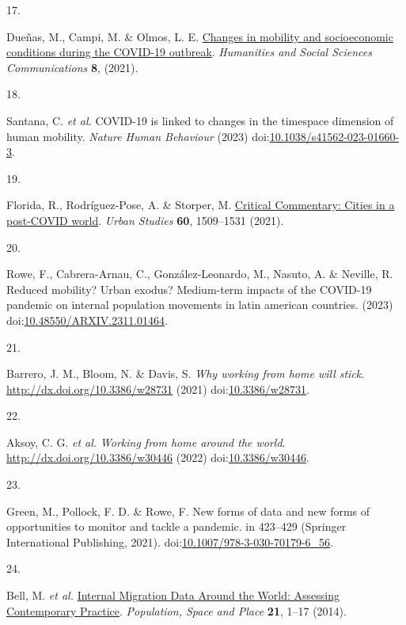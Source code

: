 \documentclass[
  11pt,
]{article}
\newlength{\cslhangindent}
\newlength{\csllabelwidth}
\newenvironment{CSLReferences}[2] %
 {\begin{list}{}{%
  \setlength{\itemindent}{0pt}
  \setlength{\leftmargin}{0pt}
  \setlength{\parsep}{0pt}
  \ifodd #1
   \setlength{\leftmargin}{\cslhangindent}
   \setlength{\itemindent}{-1\cslhangindent}
  \fi
  \setlength{\itemsep}{#2\baselineskip}}}
 {\end{list}}
\newcommand{\CSLLeftMargin}[1]{\parbox[t]{\csllabelwidth}{\strut#1\strut}}
\newcommand{\CSLRightInline}[1]{\parbox[t]{\linewidth - \csllabelwidth}{\strut#1\strut}}
\begin{document}
\begin{CSLReferences}{0}{0}
\CSLLeftMargin{17. }%
\CSLRightInline{Dueñas, M., Campi, M. \& Olmos, L. E.
\href{https://doi.org/10.1057/s41599-021-00775-0}{Changes in mobility
and socioeconomic conditions during the COVID-19 outbreak}.
\emph{Humanities and Social Sciences Communications} \textbf{8},
(2021).}

\CSLLeftMargin{18. }%
\CSLRightInline{Santana, C. \emph{et al.} COVID-19 is linked to changes
in the time{\textendash}space dimension of human mobility. \emph{Nature
Human Behaviour} (2023)
doi:\href{https://doi.org/10.1038/s41562-023-01660-3}{10.1038/s41562-023-01660-3}.}

\CSLLeftMargin{19. }%
\CSLRightInline{Florida, R., Rodríguez-Pose, A. \& Storper, M.
\href{https://doi.org/10.1177/00420980211018072}{Critical Commentary:
Cities in a post-COVID world}. \emph{Urban Studies} \textbf{60},
1509--1531 (2021).}

\CSLLeftMargin{20. }%
\CSLRightInline{Rowe, F., Cabrera-Arnau, C., González-Leonardo, M.,
Nasuto, A. \& Neville, R. Reduced mobility? Urban exodus? Medium-term
impacts of the COVID-19 pandemic on internal population movements in
latin american countries. (2023)
doi:\href{https://doi.org/10.48550/ARXIV.2311.01464}{10.48550/ARXIV.2311.01464}.}

\CSLLeftMargin{21. }%
\CSLRightInline{Barrero, J. M., Bloom, N. \& Davis, S. \emph{Why working
from home will stick}. \url{http://dx.doi.org/10.3386/w28731} (2021)
doi:\href{https://doi.org/10.3386/w28731}{10.3386/w28731}.}

\CSLLeftMargin{22. }%
\CSLRightInline{Aksoy, C. G. \emph{et al.} \emph{Working from home
around the world}. \url{http://dx.doi.org/10.3386/w30446} (2022)
doi:\href{https://doi.org/10.3386/w30446}{10.3386/w30446}.}

\CSLLeftMargin{23. }%
\CSLRightInline{Green, M., Pollock, F. D. \& Rowe, F. New forms of data
and new forms of opportunities to monitor and tackle a pandemic. in
423--429 (Springer International Publishing, 2021).
doi:\href{https://doi.org/10.1007/978-3-030-70179-6_56}{10.1007/978-3-030-70179-6\_56}.}

\CSLLeftMargin{24. }%
\CSLRightInline{Bell, M. \emph{et al.}
\href{https://doi.org/10.1002/psp.1848}{Internal Migration Data Around
the World: Assessing Contemporary Practice}. \emph{Population, Space and
Place} \textbf{21}, 1--17 (2014).}


\end{CSLReferences}
\end{document}
